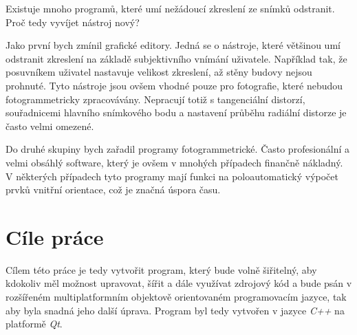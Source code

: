 	Existuje mnoho programů, které umí nežádoucí zkreslení ze snímků odstranit. Proč tedy vyvíjet nástroj nový? 
	
	Jako první bych zmínil grafické editory. Jedná se o nástroje, které většinou umí odstranit zkreslení na základě subjektivního vnímání uživatele. Například tak, že posuvníkem uživatel nastavuje velikost zkreslení, až stěny budovy nejsou prohnuté. Tyto nástroje jsou ovšem vhodné pouze pro fotografie, které nebudou fotogrammetricky zpracovávány. Nepracují totiž s tangenciální distorzí, souřadnicemi hlavního snímkového bodu a nastavení průběhu radiální distorze je často velmi omezené. 
	
	Do druhé skupiny bych zařadil programy fotogrammetrické. Často profesionální a velmi obsáhlý software, který je ovšem v mnohých případech finančně nákladný. V některých případech tyto programy mají funkci na poloautomatický výpočet prvků vnitřní orientace, což je značná úspora času.\par


\section{Cíle práce}
	Cílem této práce je tedy vytvořit program, který bude volně šiřitelný, aby kdokoliv měl možnost upravovat, šířit a dále využívat zdrojový kód a bude psán v rozšířeném multiplatformním objektově orientovaném programovacím jazyce, tak aby byla snadná jeho další úprava. Program byl tedy vytvořen v jazyce \textit{C++} na platformě \textit{Qt}.

